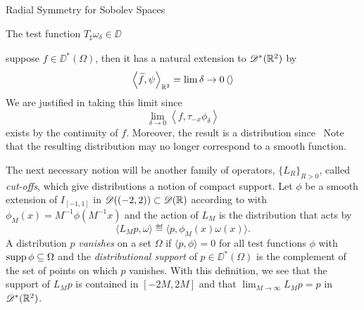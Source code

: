 \begin{chapter}{Radial Symmetry for Sobolev Spaces}
\begin{com}
The test function $T_\sharp \omega_\delta \in \DD$

suppose $f \in \DD^*(\Omega)$, then it has a natural extension to $\mathscr D^*(\mathbb R^2)$ by
\begin{equation}
  \left\langle \widetilde f, \psi \right\rangle_{\mathbb R^2} = \lim{\delta \to 0} \left\langle \right\rangle
\end{equation}
We are justified in taking this limit since
\begin{equation}
  \lim_{\delta\to 0} \left\langle f, \tau_{-x}\phi_\delta \right\rangle
\end{equation}
exists by the continuity of $f$.
Moreover, the result is a distribution since
\
Note that the resulting distribution may no longer correspond to a smooth function.

The next necessary notion will be another family of operators, $\{L_R\}_{R>0}$, called \emph{cut-offs}, which give distributions a notion of compact support.
Let $\phi$ be a smooth extension of $I_{[-1,1]}$ in $\mathscr D((-2,2)) \subset \mathscr D(\mathbb R)$ according to \Cref{thm:extension} with $\phi_M(x) = M^{-1}\phi(M^{-1}x)$ and the action of $L_M$ is the distribution that acts by
\begin{equation} \label{eq:greensFormula}
  \langle L_M p, \omega\rangle \eqdef \langle p, \phi_M(x)\omega(x)\rangle.
\end{equation}
A distribution $p$ \emph{vanishes} on a set $\Omega$ if $\langle p,\phi\rangle = 0$ for all test functions $\phi$ with $\operatorname*{supp} \phi \subseteq \Omega$ and the \emph{distributional support} of $p\in \DD^*(\Omega)$ is the complement of the set of points on which $p$ vanishes.
With this definition, we see that the support of $L_M p$ is contained in $[-2M,2M]$ and that $\lim_{M\to\infty} L_M p = p$ in $\mathscr D^*(\mathbb R^2)$.


\end{com}
\end{chapter}
